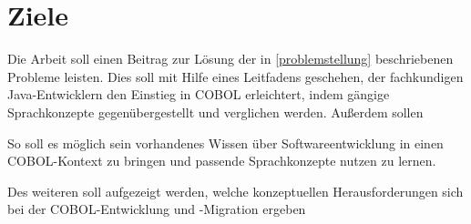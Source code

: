 \section{Ziele}

Die Arbeit \textit{\MyTitle} soll einen Beitrag zur Lösung der in \autoref{problemstellung} beschriebenen Probleme leisten. Dies soll mit Hilfe eines Leitfadens geschehen, der fachkundigen Java-Entwicklern den Einstieg in COBOL erleichtert, indem gängige Sprachkonzepte gegenübergestellt und verglichen werden. Außerdem sollen 

So soll es möglich sein vorhandenes Wissen über Softwareentwicklung in einen COBOL-Kontext zu bringen und passende Sprachkonzepte nutzen zu lernen. 

Des weiteren soll aufgezeigt werden, welche konzeptuellen Herausforderungen sich bei der COBOL-Entwicklung und -Migration ergeben